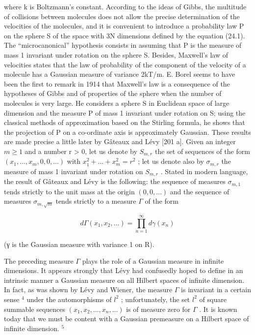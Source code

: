 where k is Boltzmann's constant. According to the ideas of Gibbs, the multitude of collisions between molecules does not allow the precise determination of the velocities of the molecules, and it is convenient to introduce a probability law P on the sphere S of the space with 3N dimensions defined by the equation (24.1). The ``microcanonical'' hypothesis consists in assuming that P is the measure of mass 1 invariant under rotation on the sphere S. Besides, Maxwell's law of velocities states that the law of probability of the component of the velocity of a molecule has a Gaussian measure of variance 2kT/m. E. Borel seems to have been the first to remark in 1914 that Maxwell's law is a consequence of the hypotheses of Gibbs and of properties of the sphere when the number of molecules is very large. He considers a sphere S in Euclidean space of large dimension and the measure P of mass 1 invariant under rotation on S; using the classical methods of approximation based on the Stirling formula, he shows that the projection of P on a co-ordinate axis is approximately Gaussian. These results are made precise a little later by Gâteaux and Lévy {[}201 a{]}. Given an integer \(m \geq 1\) and a number r > 0, let us denote by \(S_{m,r}\) the set of sequences of the form \((x_{1}, \ldots, x_{m}, 0, 0, \ldots)\) with \(x_{1}^{2} + \ldots + x_{m}^{2} = r^{2}\) ; let us denote also by \(\sigma_{m,r}\) the measure of mass 1 invariant under rotation on \(S_{m,r}\) . Stated in modern language, the result of Gâteaux and Lévy is the following: the sequence of measures \(\sigma_{m,1}\) tends strictly to the unit mass at the origin \((0, 0, \ldots)\) and the sequence of measures \(\sigma_{m,\sqrt{m}}\) tends strictly to a measure \(\Gamma\) of the form

\[
d \Gamma (x _ {1}, x _ {2}, \dots) = \prod_ {n = 1} ^ {\infty} d \gamma (x _ {n})
\]

(γ is the Gaussian measure with variance 1 on R).

The preceding measure \(\Gamma\) plays the role of a Gaussian measure in infinite dimensions. It appears strongly that Lévy had confusedly hoped to define in an intrinsic manner a Gaussian measure on all Hilbert spaces of infinite dimension. In fact, as was shown by Lévy and Wiener, the measure \(\Gamma\) is invariant in a certain sense \(^{4}\) under the automorphisms of \(l^{2}\) ; unfortunately, the set \(l^{2}\) of square summable sequences \((x_{1}, x_{2}, \ldots, x_{n}, \ldots)\) is of measure zero for \(\Gamma\) . It is known today that we must be content with a Gaussian premeasure on a Hilbert space of infinite dimension. \(^{5}\)

